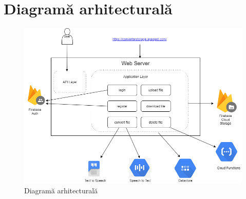\documentclass[12pt]{article}
\begin{document}
\section{Diagramă arhitecturală}
\begin{figure}[h!]
	\centering
    	\includegraphics[width=1.0\textwidth]{architectural.png}
        \caption{Diagramă arhitecturală}
\end{figure}

\section{}
\end{document}
